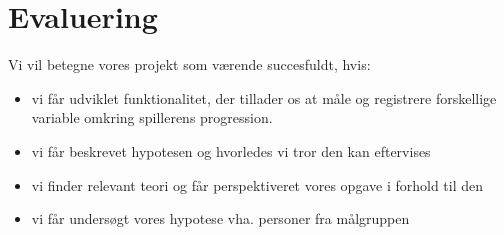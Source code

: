 \documentclass[10pt,a4paper,danish]{article}
\begin{document}
\section{Evaluering}
\label{sec:Evaluering}
Vi vil betegne vores projekt som værende succesfuldt, hvis:

\begin{itemize}
\item vi får udviklet funktionalitet, der tillader os at måle og registrere
forskellige variable omkring spillerens progression.
\item vi får beskrevet hypotesen og hvorledes vi tror den kan eftervises
\item vi finder relevant teori og får perspektiveret vores opgave i forhold
til den
\item vi får undersøgt vores hypotese vha. personer fra målgruppen
\end{itemize}
\end{document}
